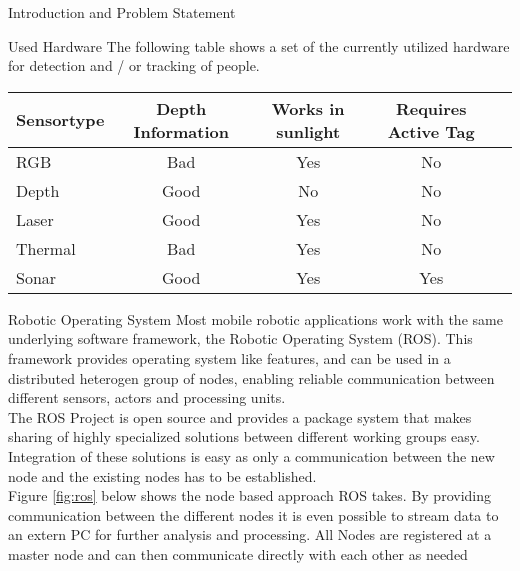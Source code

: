 \documentclass[a4paper,oneside,10pt,DIV12,headsepline,footexclude,headexclude]{scrartcl}
\begin{document}
\begin{section}{Introduction and Problem Statement}
\begin{subsection}{Used Hardware}
The following table shows a set of the currently utilized hardware for detection
and / or tracking of people.\\
\begin{minipage}{\linewidth}
\bigskip
\centering
\begin{tabular}{l | c c c c}
    \hline
    Sensortype  & Depth Information & Works in sunlight & Requires Active Tag &    \\
    \hline
    RGB         & Bad   & Yes       & No &   \\
    Depth       & Good  & No        & No &   \\
    Laser       & Good  & Yes       & No &   \\
    Thermal     & Bad   & Yes       & No &   \\
    Sonar       & Good  & Yes       & Yes &  \\
    \hline
\end{tabular}\par
{} \label{tab:title} 
\end{minipage}
\end{subsection}

\begin{subsection}{Robotic Operating System}
Most mobile robotic applications work with the same underlying software framework, the Robotic 
Operating System (ROS). This framework provides operating system like features,
and can be used in a distributed heterogen group of nodes, enabling reliable 
communication between different sensors, actors and processing units.\\
The ROS Project is open source and provides a package system that makes sharing
of highly specialized solutions between different working groups easy.
Integration of these solutions is easy as only a communication between the new
node and the existing nodes has to be established. \\
Figure \ref{fig:ros} below shows the node based approach ROS takes.
By providing communication between the different nodes it is even possible to 
stream data to an extern PC for further analysis and processing. All Nodes are
registered at a master node and can then communicate directly with each other
as needed ~\cite{RosDoku}\\


\end{subsection}
\end{section}
\end{document}
